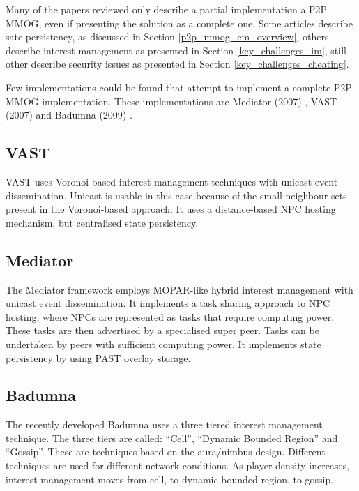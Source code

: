 \documentclass[journal,oneside,a4paper,onecolumn]{IEEEtran}
\begin{document}
Many of the papers reviewed only describe a partial implementation a P2P MMOG, even if presenting the solution as a complete one. Some articles describe sate persistency, as discussed in Section \ref{p2p_mmog_cm_overview}, others describe interest management as presented in Section \ref{key_challenges_im}, still other describe security issues as presented in Section \ref{key_challenges_cheating}.

Few implementations could be found that attempt to implement a complete P2P MMOG implementation. These implementations are Mediator (2007) \cite{Fan_phd}, VAST (2007) \cite{VON_VAST} and Badumna (2009) \cite{badumna_engine}.

\subsection{VAST}
VAST uses Voronoi-based interest management techniques with unicast event dissemination. Unicast is usable in this case because of the small neighbour sets present in the Voronoi-based approach. It uses a distance-based NPC hosting mechanism, but centralised state persistency.

\subsection{Mediator}
The Mediator framework employs MOPAR-like hybrid interest management with unicast event dissemination. It implements a task sharing approach to NPC hosting, where NPCs are represented as tasks that require computing power. These tasks are then advertised by a specialised super peer. Tasks can be undertaken by peers with sufficient computing power. It implements state persistency by using PAST overlay storage.


\subsection{Badumna}
\label{badumna}

The recently developed Badumna uses a three tiered interest management technique. The three tiers are called: ``Cell'', ``Dynamic Bounded Region'' and ``Gossip''. These are techniques based on the aura/nimbus design. Different techniques are used for different network conditions. As player density increases, interest management moves from cell, to dynamic bounded region, to gossip.
\end{document}
